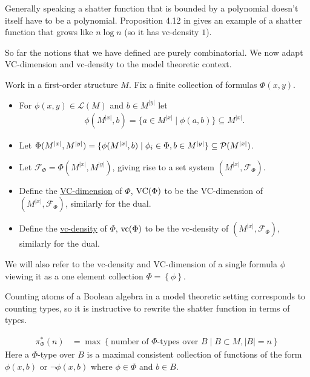 \documentclass{amsart}
\newcommand{\F}{\mathcal F}
\renewcommand{\LL}{\mathcal L}
\newcommand{\curly}[1]{\left\{#1\right\}}
\newcommand{\defn}{\underline}
\begin{document}
Generally speaking a shatter function that is bounded by a polynomial doesn't itself have to be a polynomial.
Proposition 4.12 in \cite{density} gives an example of a shatter function that grows like $n \log n$ (so it has vc-density $1$).

So far the notions that we have defined are purely combinatorial.
We now adapt VC-dimension and vc-density to the model theoretic context.

\begin{Definition}
  Work in a first-order structure $M$.
  Fix a finite collection of formulas $\Phi(x, y)$.

  \begin{itemize}
  \item For $\phi(x, y) \in \LL(M)$ and $b \in M^{|y|}$ let 
  \begin{align*}
	  \phi(M^{|x|}, b) = \{a \in M^{|x|} \mid \phi(a, b)\} \subseteq M^{|x|}.
  \end{align*}
  \item Let $\Phi(M^{|x|}, M^{|y|})= \{\phi(M^{|x|}, b) \mid \phi_i \in \Phi, b \in M^{|y|}\} \subseteq \mathcal P(M^{|x|})$.
  \item Let $\F_\Phi = \Phi(M^{|x|}, M^{|y|})$, giving rise to a set system $(M^{|x|}, \F_\Phi)$.
  \item Define the \defn{VC-dimension} of $\Phi$, $\operatorname{VC}(\Phi)$ to be the VC-dimension of $(M^{|x|}, \F_\Phi)$, similarly for the dual.
  \item Define the \defn{vc-density} of $\Phi$, $\operatorname{vc}(\Phi)$ to be the vc-density of $(M^{|x|}, \F_\Phi)$, similarly for the dual.
  \end{itemize}

  We will also refer to the vc-density and VC-dimension of a single formula $\phi$
  viewing it as a one element collection $\Phi = \curly{\phi}$.
\end{Definition}

Counting atoms of a Boolean algebra in a model theoretic setting corresponds to counting types,
so it is instructive to rewrite the shatter function in terms of types.

\begin{Definition} 
  \begin{align*}
    \pi^*_\Phi(n) &= \max \curly{\text{number of $\Phi$-types over $B$} \mid B \subset M, |B| = n}
  \end{align*}
  Here a $\Phi$-type over $B$ is a maximal consistent collection of functions of the form $\phi(x, b)$ or $\neg\phi(x, b)$
  where $\phi \in \Phi$ and $b \in B$.
\end{Definition}  
\end{document}
